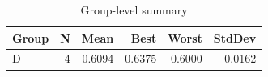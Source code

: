 \begin{table}[htbp]
\centering
\caption{Group-level summary}
\label{tab:group-summary}
\begin{tabular}{lrrrrr}
\toprule
\textbf{Group} & \textbf{N} & \textbf{Mean} & \textbf{Best} & \textbf{Worst} & \textbf{StdDev} \\
\midrule
D & 4 & 0.6094 & 0.6375 & 0.6000 & 0.0162 \\
\bottomrule
\end{tabular}
\end{table}